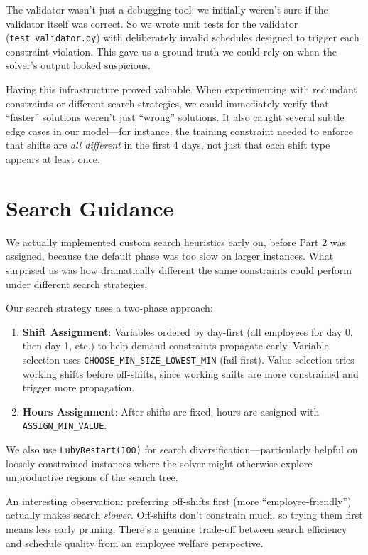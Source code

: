 \documentclass[11pt]{article}
\begin{document}
The validator wasn't just a debugging tool: we initially weren't sure if the validator itself was correct. So we wrote unit tests for the validator (\texttt{test\_validator.py}) with deliberately invalid schedules designed to trigger each constraint violation. This gave us a ground truth we could rely on when the solver's output looked suspicious.

Having this infrastructure proved valuable. When experimenting with redundant constraints or different search strategies, we could immediately verify that ``faster'' solutions weren't just ``wrong'' solutions. It also caught several subtle edge cases in our model---for instance, the training constraint needed to enforce that shifts are \textit{all different} in the first 4 days, not just that each shift type appears at least once.

\section*{Search Guidance}

We actually implemented custom search heuristics early on, before Part 2 was assigned, because the default phase was too slow on larger instances. What surprised us was how dramatically different the same constraints could perform under different search strategies.

Our search strategy uses a two-phase approach:
\begin{enumerate}
	\item \textbf{Shift Assignment}: Variables ordered by day-first (all employees for day 0, then day 1, etc.) to help demand constraints propagate early. Variable selection uses \texttt{CHOOSE\_MIN\_SIZE\_LOWEST\_MIN} (fail-first). Value selection tries working shifts before off-shifts, since working shifts are more constrained and trigger more propagation.
	\item \textbf{Hours Assignment}: After shifts are fixed, hours are assigned with \texttt{ASSIGN\_MIN\_VALUE}.
\end{enumerate}

We also use \texttt{LubyRestart(100)} for search diversification---particularly helpful on loosely constrained instances where the solver might otherwise explore unproductive regions of the search tree.

An interesting observation: preferring off-shifts first (more ``employee-friendly'') actually makes search \textit{slower}. Off-shifts don't constrain much, so trying them first means less early pruning. There's a genuine trade-off between search efficiency and schedule quality from an employee welfare perspective.
\end{document}
